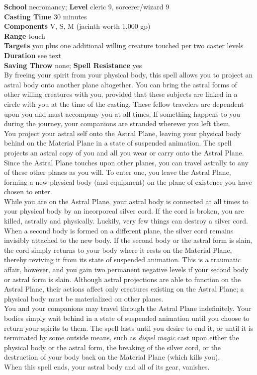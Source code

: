 \textbf{School }necromancy; \textbf{Level }cleric 9, sorcerer/wizard 9\\
\textbf{Casting Time} 30 minutes\\
\textbf{Components} V, S, M (jacinth worth 1,000 gp)\\
\textbf{Range} touch\\
\textbf{Targets} you plus one additional willing creature touched per two caster levels\\
\textbf{Duration} see text\\
\textbf{Saving Throw} none; \textbf{Spell Resistance} yes\\
By freeing your spirit from your physical body, this spell allows you to project an astral body onto another plane altogether. You can bring the astral forms of other willing creatures with you, provided that these subjects are linked in a circle with you at the time of the casting. These fellow travelers are dependent upon you and must accompany you at all times. If something happens to you during the journey, your companions are stranded wherever you left them.\\
You project your astral self onto the Astral Plane, leaving your physical body behind on the Material Plane in a state of suspended animation. The spell projects an astral copy of you and all you wear or carry onto the Astral Plane. Since the Astral Plane touches upon other planes, you can travel astrally to any of these other planes as you will. To enter one, you leave the Astral Plane, forming a new physical body (and equipment) on the plane of existence you have chosen to enter.\\
While you are on the Astral Plane, your astral body is connected at all times to your physical body by an incorporeal silver cord. If the cord is broken, you are killed, astrally and physically. Luckily, very few things can destroy a silver cord. When a second body is formed on a different plane, the silver cord remains invisibly attached to the new body. If the second body or the astral form is slain, the cord simply returns to your body where it rests on the Material Plane, thereby reviving it from its state of suspended animation. This is a traumatic affair, however, and you gain two permanent negative levels if your second body or astral form is slain. Although astral projections are able to function on the Astral Plane, their actions affect only creatures existing on the Astral Plane; a physical body must be materialized on other planes.\\
You and your companions may travel through the Astral Plane indefinitely. Your bodies simply wait behind in a state of suspended animation until you choose to return your spirits to them. The spell lasts until you desire to end it, or until it is terminated by some outside means, such as \textit{dispel magic }cast upon either the physical body or the astral form, the breaking of the silver cord, or the destruction of your body back on the Material Plane (which kills you).\\
When this spell ends, your astral body and all of its gear, vanishes.\\
